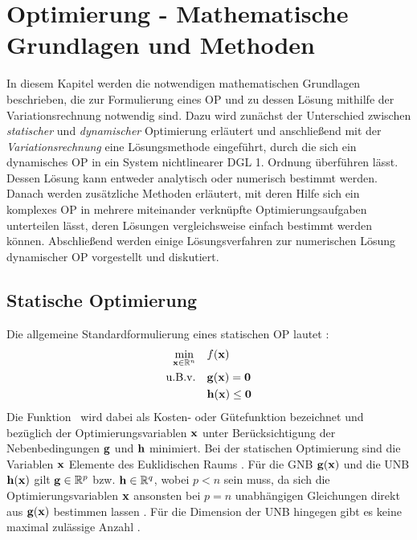 \chapter{Optimierung - Mathematische Grundlagen und Methoden}\label{cha:Optimierung}
In diesem Kapitel werden die notwendigen mathematischen Grundlagen beschrieben, die zur Formulierung eines \gls{OP} und zu dessen Lösung mithilfe der Variationsrechnung notwendig sind. Dazu wird zunächst der Unterschied zwischen \textit{statischer} und \textit{dynamischer} Optimierung erläutert und anschließend mit der \textit{Variationsrechnung} eine Lösungsmethode eingeführt, durch die sich ein dynamisches \gls{OP} in ein System nichtlinearer \gls{DGL} 1. Ordnung überführen lässt. Dessen Lösung kann entweder analytisch oder numerisch bestimmt werden. Danach werden zusätzliche Methoden erläutert, mit deren Hilfe sich ein komplexes \gls{OP} in mehrere miteinander verknüpfte Optimierungsaufgaben unterteilen lässt, deren Lösungen vergleichsweise einfach bestimmt werden können. Abschließend werden einige Lösungsverfahren zur numerischen Lösung dynamischer \gls{OP} vorgestellt und diskutiert. 
\section{Statische Optimierung}\label{sec:statischeOpt}
Die allgemeine Standardformulierung eines statischen \gls{OP} lautet \cite{KnutGraichen.2012}:
\begin{align}
	\min_{\boldsymbol{\mathrm{x}}\in\mathbb{R}^n} \quad &f(\boldsymbol{\mathrm{x}}) \label{eq:J_statisch}\\
	\textrm{u.B.v.} \quad&\mathbf{g}(\boldsymbol{\mathrm{x}}) = \boldsymbol{\mathrm{0}} \label{eq:GNB_statisch}\\
	&\mathbf{h}(\boldsymbol{\mathrm{x}}) \leq \boldsymbol{\mathrm{0}} \label{eq:UNB_statisch}
\end{align}
Die Funktion \fofx~wird dabei als Kosten- oder Gütefunktion bezeichnet und bezüglich der Optimierungsvariablen $\boldsymbol{\mathrm{x}}$ unter Berücksichtigung der Nebenbedingungen $\boldsymbol{\mathrm{g}}$ und $\boldsymbol{\mathrm{h}}$ minimiert. Bei der statischen Optimierung sind die Variablen $\boldsymbol{\mathrm{x}}$ Elemente des Euklidischen Raums \cite{KnutGraichen.2012}. Für die \gls{GNB} $\boldsymbol{\mathrm{g}}(\boldsymbol{\mathrm{x}})$ und die \gls{UNB} $\boldsymbol{\mathrm{h}}(\boldsymbol{\mathrm{x}})$ gilt $\boldsymbol{\mathrm{g}}\in\mathbb{R}^p$ bzw. $\boldsymbol{\mathrm{h}}\in\mathbb{R}^q$, wobei $p<n$ sein muss, da sich die Optimierungsvariablen $\boldsymbol{\mathrm{x}}$ ansonsten bei $p=n$ unabhängigen Gleichungen direkt aus $\mathbf{g}(\boldsymbol{\mathrm{x}})$ bestimmen lassen \cite{Papageorgiou.2012}. Für die Dimension der \gls{UNB} hingegen gibt es keine maximal zulässige Anzahl \cite{Papageorgiou.2012}.
